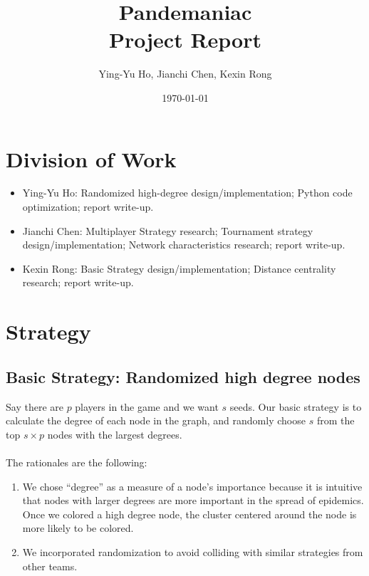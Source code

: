 \documentclass[12pt]{article}
\newcommand{\course}[2]{\def\courseName{#1} \def\sectName{#2}}
\newcommand{\assn}[1]{\def\assnName{#1}}
\begin{document}
\course{Pandemaniac}{}
\assn{Project Report}
\date{\today}
\title{\courseName \sectName \\ \assnName}
\author{Ying-Yu Ho, Jianchi Chen, Kexin Rong}
\maketitle

\thispagestyle{empty}
\section{Division of Work}
\begin{itemize}
\item Ying-Yu Ho: Randomized high-degree design/implementation; Python code optimization; report write-up.
\item Jianchi Chen: Multiplayer Strategy research; Tournament strategy design/implementation; Network characteristics research; report write-up.
\item Kexin Rong: Basic Strategy design/implementation; Distance centrality research; report write-up.
\end{itemize}

\section{Strategy}
\subsection{Basic Strategy: Randomized high degree nodes}
Say there are $p$ players in the game and we want $s$ seeds. Our basic strategy is to calculate the degree of each node in the graph, and randomly choose $s$  from the top $s \times p$ nodes with the largest degrees. \\\\
The rationales are the following: 
\begin{enumerate}
\item We chose ``degree'' as a measure of a node's importance because it is intuitive that nodes with larger degrees are more important in the spread of epidemics. Once we colored a high degree node, the cluster centered around the node is more likely to be colored.
\item We incorporated randomization to avoid colliding with similar strategies from other teams. 
\end{enumerate}
\end{document}
